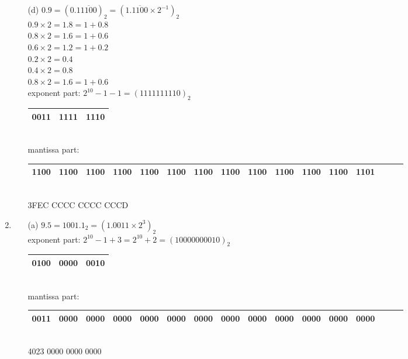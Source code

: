 \documentclass[UTF8]{ctexart}
\begin{document}
\begin{enumerate}
\begin{itemize}
\item[ (d) ] $0.9 = (0.1\overline{1100})_2 = (1.\overline{1100} \times 2^{-1})_2$ \\
$0.9 \times 2 = 1.8 = 1 + 0.8$ \\
$0.8 \times 2 = 1.6 = 1 + 0.6$ \\
$0.6 \times 2 = 1.2 = 1 + 0.2$ \\
$0.2 \times 2 = 0.4$ \\
$0.4 \times 2 = 0.8$ \\
$0.8 \times 2 = 1.6 = 1 + 0.6$ \\
exponent part: $2^{10} - 1 - 1 = (11 1111 1110)_2$ \\
\begin{tabular}{|c|c|c|}
\hline
0011 & 1111 & 1110\\
\hline
\end{tabular} \\
mantissa part: \\
\begin{tabular}{|c|c|c|c|c|c|c|c|c|c|c|c|c|c|c|c|}
\hline
1100&1100&1100&1100&1100&1100&1100&1100&1100&1100&1100&1100&1101\\
\hline
\end{tabular} \\
3FEC CCCC CCCC CCCD

\end{itemize}

\item \begin{itemize}
\item [ (a) ] $9.5 = {1001.1}_2 = (1.0011 \times 2^3)_2$ \\
exponent part: $2^{10} - 1 + 3 = 2^{10} + 2 = (100 0000 0010)_2$ \\
\begin{tabular}{|c|c|c|}
\hline
0100 & 0000 & 0010\\
\hline
\end{tabular} \\
mantissa part: \\
\begin{tabular}{|c|c|c|c|c|c|c|c|c|c|c|c|c|c|c|c|}
\hline
0011&0000&0000&0000&0000&0000&0000&0000&0000&0000&0000&0000&0000\\
\hline
\end{tabular} \\
4023 0000 0000 0000


\end{itemize}
\end{enumerate}
\end{document}
